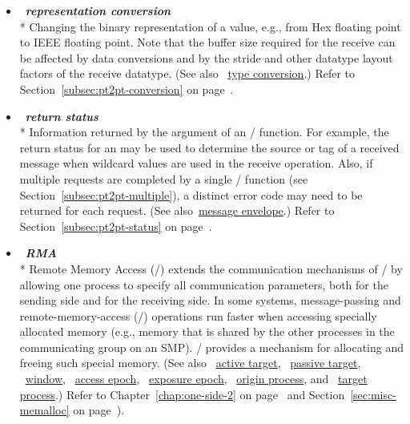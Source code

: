 \begin{itemize}
\label{glossary:representation_conversion}
\item  ~\hypertarget{glossary:representation_conversion}{\emph{\textbf{representation conversion}}} \\*
Changing the binary representation of a value,
e.g., from Hex floating point to IEEE floating point. Note that the buffer size required for the receive can be affected by data conversions and
by the stride and other datatype layout factors of the receive datatype.  
(See also ~\hyperlink{glossary:type_conversion}{type conversion}.)
Refer to Section~\ref{subsec:pt2pt-conversion} on page~\pageref{subsec:pt2pt-conversion}.

\label{glossary:return_status}
\item  ~\hypertarget{glossary:return_status}{\emph{\textbf{return status}}} \\*
Information returned by the  argument of an \MPI/ function. For example, the return status
for an  may be used to determine the
source or tag of a received message when wildcard
values are used in the receive operation.
Also, if multiple requests
are completed by a single \MPI/ function (see
Section~\ref{subsec:pt2pt-multiple}), a distinct error code may need to be
returned for each request.
(See also~\hyperlink{glossary:message_envelope}{message envelope}.)
Refer to Section~\ref{subsec:pt2pt-status} on page~\pageref{subsec:pt2pt-status}.

\label{glossary:RMA}
\item  ~\hypertarget{glossary:RMA}{\emph{\textbf{RMA}}} \\*
Remote Memory Access (\RMA/) extends the communication mechanisms of \MPI/ by
allowing one process to specify all communication parameters, both for
the sending side and for the receiving side.
In some systems, message-passing and remote-memory-access (\RMA/) operations
run faster when accessing specially allocated memory (e.g., memory that is
shared by the other processes in the communicating group on an SMP).  \MPI/
provides a mechanism for allocating and freeing such special memory.  
(See also ~\hyperlink{glossary:active_target}{active target},
~\hyperlink{glossary:passive_target}{passive target},
~\hyperlink{glossary:window}{window},
~\hyperlink{glossary:access_epoch}{access epoch},
~\hyperlink{glossary:exposure_epoch}{exposure epoch},
~\hyperlink{glossary:origin_process}{origin process},
and ~\hyperlink{glossary:target_process}{target process}.)
Refer to Chapter~\ref{chap:one-side-2} on page~\pageref{chap:one-side-2}
and Section~\ref{sec:misc-memalloc} on page~\pageref{sec:misc-memalloc}).


\end{itemize}

